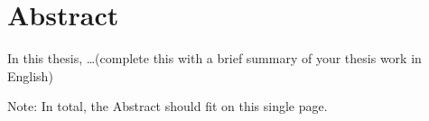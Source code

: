 \section*{Abstract}

In this thesis, \ldots (complete this with a brief summary of your thesis work in English)

Note: In total, the Abstract should fit on this single page.
